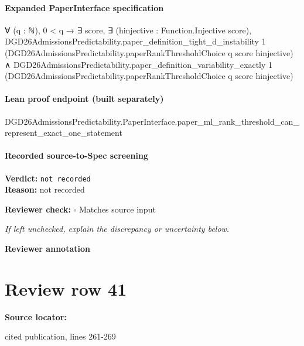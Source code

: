 \documentclass[10pt]{article}
\newcommand{\reviewerbox}{%
  \par\noindent\fbox{\parbox{0.96\linewidth}{\rule{0pt}{0.38in}}}\par
}
\newcommand{\reviewmatch}[1]{%
  \par\noindent\textbf{Reviewer check:} $\square$\; #1\par
  \noindent\emph{If left unchecked, explain the discrepancy or uncertainty below.}\par
}
\begin{document}
\paragraph{Expanded PaperInterface specification}
\begin{ReviewVerbatim}
∀ (q : ℕ),
  0 < q →
    ∃ score,
      ∃ (hinjective : Function.Injective score),
        DGD26AdmissionsPredictability.paper_definition_tight_d_instability 1
            (DGD26AdmissionsPredictability.paperRankThresholdChoice q score hinjective) ∧
          DGD26AdmissionsPredictability.paper_definition_variability_exactly 1
            (DGD26AdmissionsPredictability.paperRankThresholdChoice q score hinjective)
\end{ReviewVerbatim}

\paragraph{Lean proof endpoint (built separately)}\begin{ReviewVerbatim}
DGD26AdmissionsPredictability.PaperInterface.paper_ml_rank_threshold_can_represent_exact_one_statement
\end{ReviewVerbatim}

\paragraph{Recorded source-to-Spec screening}
\textbf{Verdict:} \texttt{not recorded}
\\
\textbf{Reason:} not recorded
\reviewmatch{Matches source input}
\noindent\textbf{Reviewer annotation}\par
\reviewerbox
\clearpage
\hypertarget{source-claim-47a9f492a25c4e98}{}
\section*{Review row 41}
\textbf{Source locator:} {\footnotesize\raggedright cited publication, lines 261-\allowbreak{}269\par}
\end{document}
